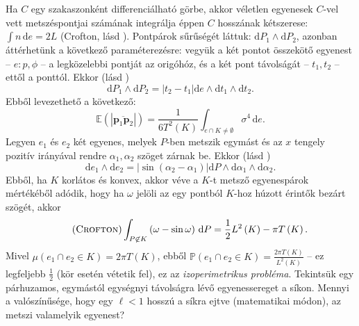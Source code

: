 \documentclass[%
	DIV=15,appendixprefix]{scrreprt}
\theoremstyle{definition}
\theoremstyle{remark}
\newcommand{\mean}{\mathbb{E}}
\newcommand{\prob}{\mathbb{P}}
\begin{document}
Ha $ C $ egy szakaszonként differenciálható
görbe, akkor véletlen egyenesek $ C $-vel vett metszéspontjai számának integrálja éppen $ C $
hosszának kétszerese: $ \int n \, \mathrm{ d } e = 2 L $ (Crofton, lásd \cite[31.~oldal]{Santalo}).
%
Pontpárok sűrűségét láttuk: $ \mathrm{ d } P_{ 1 } \wedge \mathrm{ d } P_{ 2 } $, azonban
áttérhetünk a következő paraméterezésre: vegyük a két pontot összekötő egyenest -- $ e\colon p,{}
\phi $ -- a legközelebbi pontját az origóhóz, és a két pont távolságát -- $t_{ 1 }, {} t_{ 2 }$ --
ettől a ponttól. Ekkor (lásd \cite[46.~oldal]{Santalo})
\begin{equation*}
	 \mathrm{ d } P_{ 1 } \wedge \mathrm{ d } P_{ 2 } = \left| t_{ 2 } - t_{ 1 }\right| \mathrm{ d }
	 e \wedge \mathrm{ d } t_{ 1 } \wedge \mathrm{ d } t_{ 2 }.
\end{equation*}
Ebből levezethető a következő:
\begin{equation*}
	\mean \left( \left| \overline{ \mathbf{ p }_{ 1 } \mathbf{ p }_{ 2 } }\right| \right) =
	\frac{ 1 }{ 6 T^{ 2 } \left( K \right) } \int_{ e \cap K \neq \emptyset } \sigma^{ 4 } \,
	\mathrm{ d } e.
\end{equation*}
Legyen $ e_{ 1 } $ és $ e_{ 2 } $ két egyenes, melyek $ P $-ben metszik egymást és az $ x $ tengely
pozitív irányával rendre $ \alpha_{ 1 },{} \alpha_{ 2 } $ szöget zárnak be. Ekkor (lásd
\cite[49.~oldal]{Santalo})
\begin{equation*}
	\mathrm{ d } e_{ 1 } \wedge \mathrm{ d } e_{ 2 } = \left| \sin \left( \alpha_{ 2 } -
	\alpha_{ 1 } \right) \right| \mathrm{ d } P \wedge \mathrm{ d } \alpha_{ 1 } \wedge
	\mathrm{ d } \alpha_{ 2 }.
\end{equation*}
Ebből, ha $ K $ korlátos és konvex, akkor véve a $ K $-t metsző egyenespárok mértékéből adódik,
hogy ha $ \omega $ jelöli az egy pontból $ K $-hoz húzott érintők bezárt szögét, akkor
\begin{equation}\tag{\textsc{Crofton}}
	\int_{ P \not \in K } \left( \omega - \sin \omega  \right) \, \mathrm{ d } P = \frac{ 1 }{ 2 }
	L^{ 2 } \left( K \right) - \pi T \left( K \right).
\end{equation}
Mivel $ \mu \left( e_{ 1 } \cap e_{ 2 } \in K \right) = 2 \pi T \left( K \right) $, ebből $ \prob
\left( e_{ 1 } \cap e_{ 2 } \in K \right) = \frac{ 2 \pi T \left( K \right) }{ L^{ 2 } \left( K
\right) } $ -- ez legfeljebb $ \frac{ 1 }{ 2 } $ (kör esetén vétetik fel), ez az
\emph{izoperimetrikus probléma}.
%
Tekintsük egy párhuzamos, egymástól egységnyi távolságra lévő egyenessereget a síkon. Mennyi a
valószínűsége, hogy egy $ \ell < 1 $ hosszú  a síkra ejtve (matematikai módon), az
metszi valamelyik egyenest?
\end{document}
